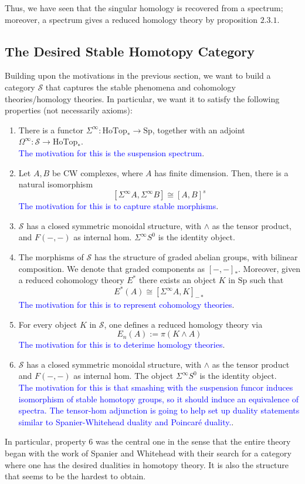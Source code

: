 \documentclass{article}
\theoremstyle{definition}
\theoremstyle{definition}
\theoremstyle{definition}
\theoremstyle{definition}
\theoremstyle{definition}
\theoremstyle{definition}
\theoremstyle{definition}
\begin{document}
Thus, we have seen that the singular homology is recovered from a spectrum; moreover, a spectrum gives a reduced homology theory by proposition $2.3.1$. 

\subsection{The Desired Stable Homotopy Category}
Building upon the motivations in the previous section, we want to build a category $\mathcal{S}$ that captures the stable phenomena and cohomology theories/homology theories. In particular, we want it to satisfy the following properties (not necessarily axioms):
\begin{enumerate}
    \item There is a functor $\Sigma^{\infty}: \textrm{HoTop}_*\to \textrm{Sp}$, together with an adjoint $\Omega^{\infty}: \mathcal{S}\to \textrm{HoTop}_*$. \\
    \textcolor{blue}{The motivation for this is the suspension spectrum}.
    \item Let $A,B$ be CW complexes, where $A$ has finite dimension. Then, there is a natural isomorphism
    \[[\Sigma^{\infty}A, \Sigma^{\infty}B]\cong [A,B]^s\]
    \textcolor{blue}{The motivation for this is to capture stable morphisms}.
    \item $\mathcal{S}$ has a closed symmetric monoidal structure, with $\wedge$ as the tensor product, and $F(-,-)$ as internal hom. $\Sigma^{\infty}S^0$ is the identity object.
    \item The morphisms of $\mathcal{S}$ has the structure of graded abelian groups, with bilinear composition. We denote that graded components as $[-,-]_*$. Moreover, given a reduced cohomology theory $E^*$ there exists an object $K$ in $\textrm{Sp}$ such that 
    \[E^*(A)\cong [\Sigma^{\infty}A, K]_{-*}\]
    \textcolor{blue}{The motivation for this is to represent cohomology theories}.\\
    \item For every object $K$ in $\mathcal{S}$, one defines a reduced homology theory via 
    \[E_n(A):=\pi(K\wedge A)\]
    \textcolor{blue}{The motivation for this is to deterime homology theories}.
    \\
    \item $\mathcal{S}$ has a closed symmetric monoidal structure, with $\wedge$ as the tensor product and $F(-,-)$ as internal hom. The object $\Sigma^{\infty}S^0$ is the identity object.\\
    \textcolor{blue}{The motivation for this is that smashing with the suspension funcor induces isomorphism of stable homotopy groups, so it should induce an equivalence of spectra. The tensor-hom adjunction is going to help set up duality statements similar to Spanier-Whitehead duality and Poincar\'e duality.}.
\end{enumerate}
In particular, property $6$ was the central one in the sense that the entire theory began with the work of Spanier and Whitehead with their search for a category where one has the desired dualities in homotopy theory. It is also the structure that seems to be the hardest to obtain.  
\end{document}
